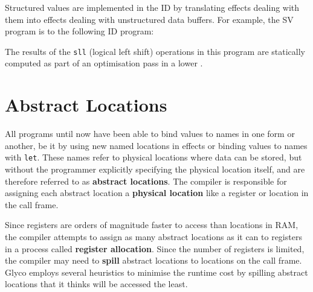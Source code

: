 \documentclass[main.tex]{subfiles}
\begin{document}
Structured values are implemented in the  ID by translating effects dealing with them into effects dealing with unstructured data buffers. For example, the SV program
is \lowered{} to the following ID program:

The results of the \texttt{sll} (logical left shift) operations in this program are statically computed as part of an optimisation pass in a lower .

\section{Abstract Locations} \label{sct:id}
All programs until now have been able to bind values to names in one form or another, be it by using new named locations in effects or binding values to names with \texttt{let}. These names refer to physical locations where data can be stored, but without the programmer explicitly specifying the physical location itself, and are therefore referred to as \textbf{abstract locations}. The compiler is responsible for assigning each abstract location a \textbf{physical location} like a register or location in the call frame.

Since registers are orders of magnitude faster to access than locations in RAM, the compiler attempts to assign as many abstract locations as it can to registers in a process called \textbf{register allocation}. Since the number of registers is limited, the compiler may need to \textbf{spill} abstract locations to locations on the call frame. Glyco employs several heuristics to minimise the runtime cost by spilling abstract locations that it thinks will be accessed the least.
\end{document}
